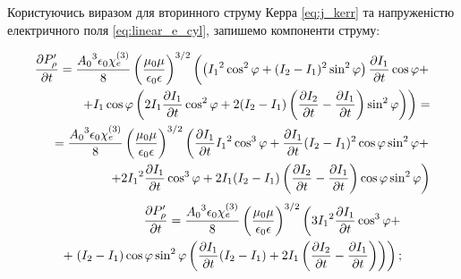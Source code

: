 Користуючись виразом для вторинного струму Керра \eqref{eq:j_kerr} та 
напруженістю електричного поля \eqref{eq:linear_e_cyl}, запишемо компоненти 
струму:

\textcolor{blue} { \begin{equation*} \begin{aligned}
\frac{\partial P_\rho^\prime}{\partial t}   = \frac{ {A_0}^3 \epsilon_0 \chi_e^{(3)} }{ 8 } 
\left( \frac{\mu_0 \mu} {\epsilon_0 \epsilon} \right)^{3/2} \left(
\left( {I_1}^2 \cos^2 \varphi + ( I_2 - I_1 )^2 \sin^2 \varphi \right)
\frac{\partial I_1}{\partial t} \cos \varphi + \right. \\
\left. + I_1 \cos \varphi \left( 2 I_1 \frac{\partial I_1}{\partial t} \cos^2 \varphi + 
2 ( I_2 - I_1 ) \left( \frac{\partial I_2}{\partial t} - \frac{\partial I_1}{\partial t} \right) 
\sin^2 \varphi \right) \right) = \\ 
= \frac{ {A_0}^3 \epsilon_0 \chi_e^{(3)} }{ 8 } 
\left( \frac{\mu_0 \mu} {\epsilon_0 \epsilon} \right)^{3/2} \left(
\frac{\partial I_1}{\partial t} {I_1}^2 \cos^3 \varphi + \frac{\partial I_1}{\partial t} ( I_2 - I_1 )^2 
\cos \varphi \sin^2 \varphi + \right. \\
\left. + 2 {I_1}^2 \frac{\partial I_1}{\partial t} \cos^3 \varphi + 
2 I_1 ( I_2 - I_1 ) \left( \frac{\partial I_2}{\partial t} - \frac{\partial I_1}{\partial t} \right) 
\cos \varphi \sin^2 \varphi \right)
\end{aligned} \end{equation*} }
%
\begin{equation*} \begin{aligned}
\frac{\partial P_\rho^\prime}{\partial t} = \frac{ {A_0}^3 \epsilon_0 \chi_e^{(3)} }{ 8 } 
\left( \frac{\mu_0 \mu} {\epsilon_0 \epsilon} \right)^{3/2} \left(
3 {I_1}^2 \frac{\partial I_1}{\partial t} \cos^3 \varphi + \right. \\
+ \left. ( I_2 - I_1 ) \cos \varphi \sin^2 \varphi \left( 
\frac{\partial I_1}{\partial t} ( I_2 - I_1 ) + 2 I_1 \left( \frac{\partial I_2}{\partial t} - 
\frac{\partial I_1}{\partial t} \right) \right) \right);
\end{aligned} \end{equation*}
%
